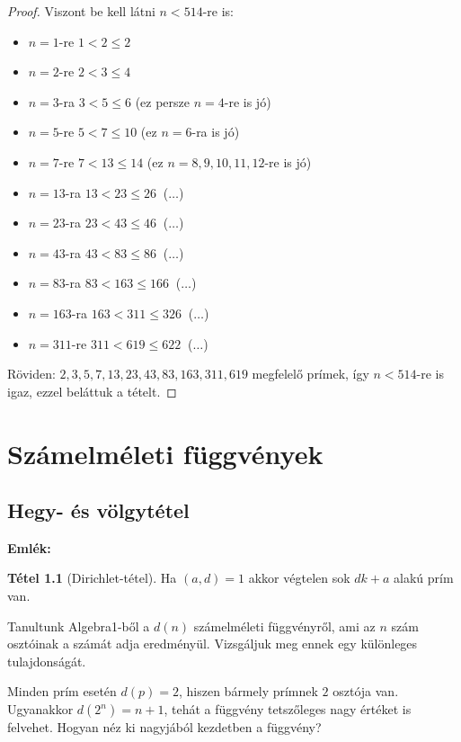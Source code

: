 \documentclass[12pt]{book}
\theoremstyle{plain} %
\theoremstyle{definition} %
\newtheorem{theo/}{Tétel}[section]
\newenvironment{theo}
  {\renewcommand{\qedsymbol}{$\clubsuit$}%
   \pushQED{\qed}\begin{theo/}}
  {\popQED\end{theo/}}
\theoremstyle{remark}
\renewcommand\qedsymbol{$\blacksquare$}
\numberwithin{equation}{section}  %
\begin{document}
\begin{proof}
		Viszont be kell látni $n < 514$-re is:
		\begin{itemize}
			\item{$n = 1$-re $1<2\leq 2$}
			\item{$n = 2$-re $2<3\leq 4$}
			\item{$n = 3$-ra $3<5\leq 6$ (ez persze $n=4$-re is jó)}
			\item{$n = 5$-re $5<7\leq 10$ (ez $n=6$-ra is jó)}
			\item{$n = 7$-re $7<13\leq 14$ (ez $n=8,9,10,11,12$-re is jó)}
			\item{$n = 13$-ra $13<23\leq 26\ $ ($\ldots$)}
			\item{$n = 23$-ra $23<43\leq 46\ $ ($\ldots$)}
			\item{$n = 43$-ra $43<83\leq 86\ $ ($\ldots$)}
			\item{$n = 83$-ra $83<163\leq 166\ $ ($\ldots$)}
			\item{$n = 163$-ra $163<311\leq 326\ $ ($\ldots$)}
			\item{$n = 311$-re $311< 619 \leq 622\ $ ($\ldots$)}
		\end{itemize}
		Röviden: $2, 3, 5, 7, 13, 23, 43, 83, 163, 311, 619$ megfelelő prímek, így $n < 514$-re is igaz, ezzel beláttuk a tételt.
	\end{proof}


	\chapter{Számelméleti függvények}
	
	
	\section{Hegy- és völgytétel}
	
	\textbf{Emlék:}
	
	\begin{theo}[Dirichlet-tétel]
		Ha $(a,d)=1$ akkor végtelen sok $dk+a$ alakú prím van.
	\end{theo}
	
	Tanultunk Algebra1-ből a $d(n)$ számelméleti függvényről, ami az $n$ szám osztóinak a számát adja eredményül. Vizsgáljuk meg ennek egy különleges tulajdonságát.
	
	Minden prím esetén $d(p)=2$, hiszen bármely prímnek $2$ osztója van. Ugyanakkor $d(2^{n}) = n+1$, tehát a függvény tetszőleges nagy értéket is felvehet. Hogyan néz ki nagyjából kezdetben a függvény?
	
\end{document}

